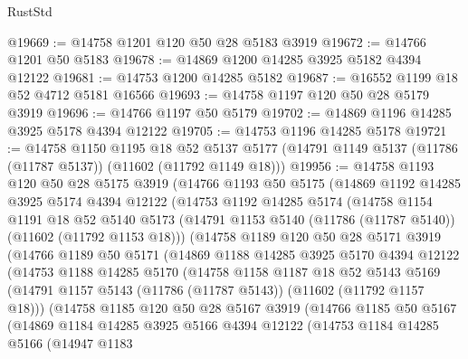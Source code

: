 \begin{lexlean}{RustStd}
\begin{coremodule}
@19669 := @14758 @1201 @120 @50 @28 @5183 @3919
@19672 := @14766 @1201 @50 @5183
@19678 := @14869 @1200 @14285 @3925 @5182 @4394 @12122
@19681 := @14753 @1200 @14285 @5182
@19687 := @16552 @1199 @18 @52 @4712 @5181 @16566
@19693 := @14758 @1197 @120 @50 @28 @5179 @3919
@19696 := @14766 @1197 @50 @5179
@19702 := @14869 @1196 @14285 @3925 @5178 @4394 @12122
@19705 := @14753 @1196 @14285 @5178
@19721 := @14758
    @1150
    @1195
    @18
    @52
    @5137
    @5177
    (@14791 @1149 @5137 (@11786 (@11787 @5137)) (@11602 (@11792 @1149 @18)))
@19956 := @14758
    @1193
    @120
    @50
    @28
    @5175
    @3919
    (@14766
      @1193
      @50
      @5175
      (@14869
        @1192
        @14285
        @3925
        @5174
        @4394
        @12122
        (@14753
          @1192
          @14285
          @5174
          (@14758
            @1154
            @1191
            @18
            @52
            @5140
            @5173
            (@14791 @1153 @5140 (@11786 (@11787 @5140)) (@11602 (@11792 @1153 @18)))
            (@14758
              @1189
              @120
              @50
              @28
              @5171
              @3919
              (@14766
                @1189
                @50
                @5171
                (@14869
                  @1188
                  @14285
                  @3925
                  @5170
                  @4394
                  @12122
                  (@14753
                    @1188
                    @14285
                    @5170
                    (@14758
                      @1158
                      @1187
                      @18
                      @52
                      @5143
                      @5169
                      (@14791 @1157 @5143 (@11786 (@11787 @5143)) (@11602 (@11792 @1157 @18)))
                      (@14758
                        @1185
                        @120
                        @50
                        @28
                        @5167
                        @3919
                        (@14766
                          @1185
                          @50
                          @5167
                          (@14869
                            @1184
                            @14285
                            @3925
                            @5166
                            @4394
                            @12122
                            (@14753
                              @1184
                              @14285
                              @5166
                              (@14947
                                @1183

\end{coremodule}
\end{lexlean}
